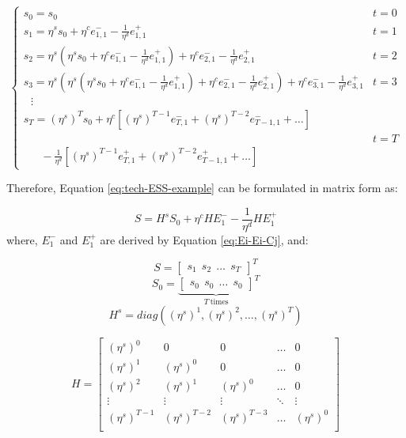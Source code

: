 \begin{equation*}
\begin{cases}
 s_0 = s_0 &  t = 0 \\
s_1 = \eta^s s_0 +  \eta^c e_{1,1}^{-}  - \frac{1}{\eta^d} e_{1,1}^{+} & t = 1\\
s_2 = \eta^s \left(\eta^s s_0 +  \eta^c e_{1,1}^{-}  - \frac{1}{\eta^d} e_{1,1}^{+}\right) + \eta^c e_{2,1}^{-}  - \frac{1}{\eta^d} e_{2,1}^{+} & t = 2 \\
s_3 = \eta^s \left( \eta^s \left(\eta^s s_0 +  \eta^c e_{1,1}^{-}  - \frac{1}{\eta^d} e_{1,1}^{+}\right) + \eta^c e_{2,1}^{-}  - \frac{1}{\eta^d} e_{2,1}^{+}\right) + \eta^c e_{3,1}^{-}  - \frac{1}{\eta^d} e_{3,1}^{+} & t = 3 \\
~~~\vdots \\
s_T = {(\eta^s)}^{T} s_0+ \eta^c \left[ {(\eta^s)}^{T-1}  e_{T,1}^{-} + {(\eta^s)}^{T-2} e_{T-1,1}^{-} + \dots \right] \\
~~& t = T \\
~~~~~~~- \frac{1}{\eta^d} \left[{(\eta^s)}^{T-1}  e_{T,1}^{+} + {(\eta^s)}^{T-2}  e_{T-1,1}^{+} + \dots \right]  
\end{cases}
\end{equation*}

Therefore, Equation \eqref{eq:tech-ESS-example} can be formulated in matrix form as:

\begin{equation*}
S = H^s S_0 + \eta^c  H E^-_1 - \frac{1}{\eta^d} H E^+_1
\end{equation*}
where, $E^-_1$ and $E^+_1$ are derived by Equation \eqref{eq:Ei-Ei-Cj}, and:

\begin{equation*}
S = \begin{bmatrix}
s_1~~s_2~~\dots~~s_T
\end{bmatrix}^T
\end{equation*}
\begin{equation*}
S_0 = {\underbrace{\begin{bmatrix}
	s_0~~s_0~~ \dots~~s_0
	\end{bmatrix}}_{T~\text{times}}}^T
\end{equation*}
\begin{equation*}
H^s = diag({(\eta^s)}^1 , {(\eta^s)}^2, \dots,{(\eta^s)}^T)
\end{equation*}

\[
H
=
\begin{bmatrix}
{(\eta^s)}^0 & 0 & 0 &  \dots & 0 \\
{(\eta^s)}^1 & {(\eta^s)}^0 & 0 &  \dots & 0 \\
{(\eta^s)}^2 & {(\eta^s)}^1 & {(\eta^s)}^0 &  \dots & 0 \\
\vdots & \vdots & \vdots &  \ddots & \vdots \\
{(\eta^s)}^{T-1} & {(\eta^s)}^{T-2} & {(\eta^s)}^{T-3} & \dots & {(\eta^s)}^0 \\
\end{bmatrix}
\]
\newline

